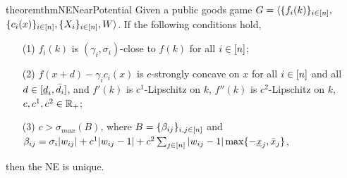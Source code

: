 \begin{restatable}{theorem}{thmNENearPotential}
\label{thm:NE:unique:near-potential}
Given a public goods game $G = \langle \{f_i(k)\}_{i\in[n]},$ $\{c_i(x)\}_{i\in[n]}, \{X_i\}_{i\in[n]}, W \rangle$. If the following conditions hold, 
\begin{itemize}
    \item[(1)] $f_i(k)$ is $(\gamma_i,\sigma_i)$-close to $f(k)$ for all ${i\in[n]}$;
    \item[(2)] $f(x + d) - \gamma_i c_i(x)$ is $c$-strongly concave on $x$ for all ${i\in[n]}$ and all $d \in [\underline{d}_i, \bar{d}_i]$, and $f'(k)$ is $c^1$-Lipschitz on $k$, $f''(k)$ is $c^2$-Lipschitz on $k$, $c,c^1,c^2\in 
    \mathbb{R}_+$;
    \item[(3)] $c > \sigma_{max}(B)$, where $B = \{\beta_{ij}\}_{i,j\in[n]}$ and $\beta_{ij} = \sigma_i |w_{ij}| + c^1 |w_{ij}-1| + c^2 \sum_{j\in[n]} |w_{ij}-1| \max\{ -\underline{x}_j, \bar{x}_j \}$,
\end{itemize}
then the NE is unique.
\end{restatable}